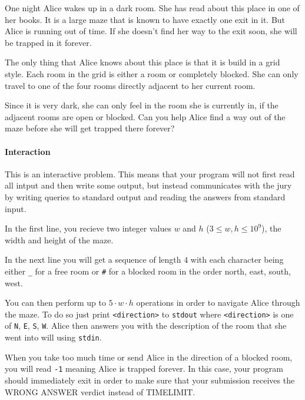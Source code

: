 



\makeheader

One night Alice wakes up in a dark room. She has read about this place in one of her books. It is a large maze that is known to have exactly one exit in it. But Alice is running out of time. If she doesn't find her way to the exit soon, she will be trapped in it forever.

The only thing that Alice knows about this place is that it is build in a grid style. Each room in the grid is either a room or completely blocked. She can only travel to one of the four rooms directly adjacent to her current room.

Since it is very dark, she can only feel in the room she is currently in, if the adjacent rooms are open or blocked. Can you help Alice find a way out of the maze before she will get trapped there forever?

\paragraph*{Interaction}

This is an interactive problem. This means that your program will not first read all intput and then write some output, but instead communicates with the jury by writing queries to standard output and reading the answers from standard input.

In the first line, you recieve two integer values $w$ and $h$ ($3\leq w, h \leq 10^9$), the width and height of the maze.

In the next line you will get a sequence of length $4$ with each character being either \texttt{\_} for a free room or \texttt{\#} for a blocked room in the order north, east, south, west.

You can then perform up to $5 \cdot w \cdot h$ operations in order to navigate Alice through the maze. To do so just print \texttt{<direction>} to \texttt{stdout} where \texttt{<direction>} is one of \texttt{N}, \texttt{E}, \texttt{S}, \texttt{W}. Alice then answers you with the description of the room that she went into will using \texttt{stdin}. 

When you take too much time or send Alice in the direction of a blocked room, you will read \texttt{-1} meaning Alice is trapped forever. In this case, your program should immediately exit in order to make sure that your submission receives the WRONG ANSWER verdict instead of TIMELIMIT.

